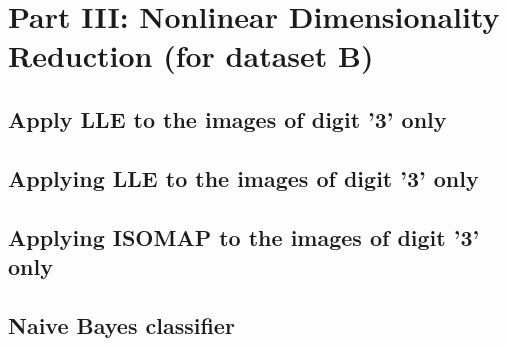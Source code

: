 \section{Part III: Nonlinear Dimensionality Reduction (for dataset B)}
\subsection{Apply LLE to the images of digit '3' only}

\subsection{Applying LLE to the images of digit '3' only}


\subsection{Applying ISOMAP to the images of digit '3' only}



\subsection{Naive Bayes classifier}

